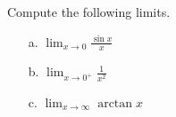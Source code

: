 {Compute the following limits.
\begin{enumerate}
\item[a.] $\displaystyle \lim_{x\rightarrow 0}  \frac{\sin x}{x}$
\item[b.] $\displaystyle \lim_{x\rightarrow 0^+} \displaystyle \frac{1}{x^2}$
\item[c.] $\displaystyle \lim_{x\rightarrow \infty} \displaystyle \arctan x$
\end{enumerate}}
{}